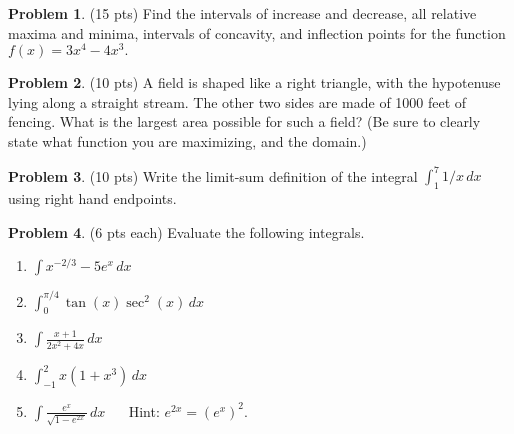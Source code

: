 \documentclass[12pt,letterpaper]{amsart}
\theoremstyle{definition}
\newtheorem{problem}{Problem}[]
\begin{document}
\newpage

\begin{problem}(15 pts)
 Find the intervals of increase and decrease, all relative maxima and minima,
intervals of concavity, and inflection points for 
the function $f(x) = 3x^4-4x^3.$
\end{problem}
\newpage



\begin{problem}(10 pts) 
A field is shaped like a right triangle, with the hypotenuse lying along a straight stream. The other two sides are made of 1000 feet 
of fencing. What is the largest area possible for such a field? (Be sure to clearly state what function you are maximizing, and the domain.)
\end{problem}
\vspace{4in}

\begin{problem}(10 pts) 
Write the limit-sum definition of the integral  $\displaystyle \int_1^7 1/x \, dx$ using right hand endpoints.  
\end{problem}
\newpage

\begin{problem}(6 pts each)  
 Evaluate the following integrals. 
\begin{enumerate}
 \item $\displaystyle \int x^{-2/3} -5e^x\,dx$
\vskip 1.25in
 \item $\displaystyle \int_0^{\pi/4} \tan(x) \sec^2(x)\,dx$
\vskip 1.25in
 \item $\displaystyle \int \frac{x+1}{2x^2+4x}\,dx$
\vskip 1.25in
 \item $\displaystyle \int_{-1}^2 x(1+x^3)\,dx$
\vskip 1.25in
 \item $\displaystyle \int\frac{e^x}{\sqrt{1-e^{2x}}}\,dx$ $\quad$ Hint: $e^{2x} = (e^x)^2$.  
\end{enumerate}

\end{problem}
\end{document}
